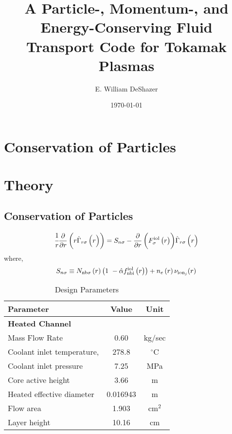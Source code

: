 \documentclass[]{article}
\title{ A Particle-, Momentum-, and Energy-Conserving Fluid Transport Code for Tokamak Plasmas}
\author{E. William DeShazer}
\date{\today}
\def \diffpfunc #1#2{\diffp*{\left(\vphantom{\diffp*{}#2}#1\right)}#2}
\def \func #1#2{#1\left(\vphantom{#1} #2\right)}
\def \FrIOL #1{\func{ F_{#1\vphantom{j}}^\mathrm{iol} }{r}} %
\def \flux #1{\func{ \hat{\Gamma}_{r#1}}{r} }
\begin{document}
\maketitle

\section{Conservation of Particles}

\section{Theory} \label{sec:Theory}
\subsection{Conservation of Particles} \label{sub:ParticleConservation}
	\begin{equation}
		\cfrac{1}{r} \diffpfunc{ r \func{\hat{\Gamma}_{r\sigma}}{r}}{r} =
			S_{n\sigma} -\diffpfunc{ \FrIOL{\sigma} }{r} \flux{\sigma}
	\label{eqn:Continuity}
	\end{equation}
	where,
	\begin{equation}
		S_{n\sigma} \equiv \func{N_{\mathrm{nb}\sigma}}{r} \left( 1\ -\hat{\alpha } \func{f^\mathrm{iol}_\mathrm{nbi}}{r} \right)+ \func{n_{e}}{r} \nu _{\mathrm{ion}_j} (r)
	\label{eqn:Source}
	\end{equation}

	\begin{table}[h]
		\centering
		\caption{Design Parameters}
		\begin{tabular}{l c c}\hline \label{tab:DesignParams}
			Parameter                     & Value     & Unit        \\
			\hline
			\textbf{Heated Channel}	      &           &             \\
			Mass Flow Rate  			  & 0.60      &  kg/sec     \\
			Coolant inlet temperature, 	  & 278.8     &  $^\circ$C  \\
			Coolant inlet pressure        & 7.25      &  MPa        \\
			Core active height            & 3.66      &  m          \\
			Heated effective diameter     & 0.016943  &  m          \\
			Flow area                     & 1.903     &  cm$^2$     \\
			Layer height                  & 10.16     &  cm         \\
			\hline
		\end{tabular}
	\end{table}
\end{document}
